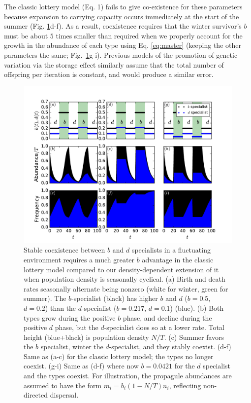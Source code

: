 \documentclass[11pt]{article}
\begin{document}
The classic lottery model (Eq. 1) fails to give co-existence for these parameters because expansion to carrying capacity occurs immediately at the start of the summer (Fig. \ref{fig:fluctuatingselection}d-f). As a result, coexistence requires that the winter survivor's $b$ must be about $5$ times smaller than required when we properly account for the growth in the abundance of each type using Eq. \eqref{eq:master} (keeping the other parameters the same; Fig.~\ref{fig:fluctuatingselection}g-i). Previous models of the promotion of genetic variation via the storage effect  \citep{ellner_1994} similarly assume that the total number of offspring per iteration is constant, and would produce a similar error. 


\begin{figure}
\centering
\includegraphics[scale=0.7]{fluctuatingselection.pdf}
\caption{\label{fig:fluctuatingselection} Stable coexistence between $b$ and $d$ specialists in a fluctuating environment requires a much greater $b$ advantage in the classic lottery model compared to our density-dependent extension of it when population density is seasonally cyclical. (a) Birth and death rates seasonally alternate being nonzero (white for winter, green for summer). The $b$-specialist (black) has higher $b$ and $d$ ($b=0.5$, $d=0.2$) than the $d$-specialist ($b=0.217$, $d=0.1$) (blue). (b) Both types grow during the positive $b$ phase, and decline during the positive $d$ phase, but the $d$-specialist does so at a lower rate. Total height (blue+black) is population density $N/T$. (c) Summer favors the $b$ specialist, winter the $d$-specialist, and they stably coexist. (d-f) Same as (a-c) for the classic lottery model; the types no longer coexist. (g-i) Same as (d-f) where now $b = 0.0421$ for the $d$ specialist and the types coexist. For illustration, the propagule abundances are assumed to have the form $m_i=b_i(1-N/T)n_i$, reflecting non-directed dispersal.} 
\end{figure}
\end{document}
